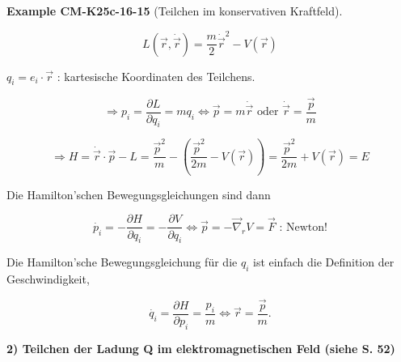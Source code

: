 \documentclass[10pt, letterpaper]{article}
\newcommand{\CustomHeading}[3]{%
  \par\medskip\noindent%
  \textbf{#1 #2} \textnormal{(#3)}.\enskip%
}
\newenvironment{EXA}[2]{\begin{unitbox}\CustomHeading{Example}{#1}{#2}}{\end{unitbox}}
\begin{document}
\begin{EXA}{CM-K25c-16-15}{Teilchen im konservativen Kraftfeld}
\[L(\vec{r}, \dot{\vec{r}}) = \frac{m}{2}\dot{\vec{r}}^2 - V(\vec{r})\]

$q_i = e_i\cdot\vec{r}$ : kartesische Koordinaten des Teilchens.

\[\Rightarrow p_i = \frac{\partial L}{\partial q_i} = mq_i \Leftrightarrow \vec{p} = m\dot{\vec{r}} \text{ oder } \dot{\vec{r}} = \frac{\vec{p}}{m}\]

\[\Rightarrow H = \dot{\vec{r}}\cdot\vec{p} - L = \frac{\vec{p}^2}{m} - \left(\frac{\vec{p}^2}{2m} - V(\vec{r})\right) = \frac{\vec{p}^2}{2m} + V(\vec{r}) = E\]

Die Hamilton'schen Bewegungsgleichungen sind dann

\[\dot{p_i} = -\frac{\partial H}{\partial q_i} = -\frac{\partial V}{\partial q_i} \Leftrightarrow \vec{p} = -\vec{\nabla}_r V = \vec{F} \text{ : Newton!}\]

Die Hamilton'sche Bewegungsgleichung für die $q_i$ ist einfach die Definition der Geschwindigkeit,

\[\dot{q_i} = \frac{\partial H}{\partial p_i} = \frac{p_i}{m} \Leftrightarrow \vec{r} = \frac{\vec{p}}{m}.\]
\end{EXA}




\textbf{2) Teilchen der Ladung Q im elektromagnetischen Feld (siehe S. 52)}
\end{document}
